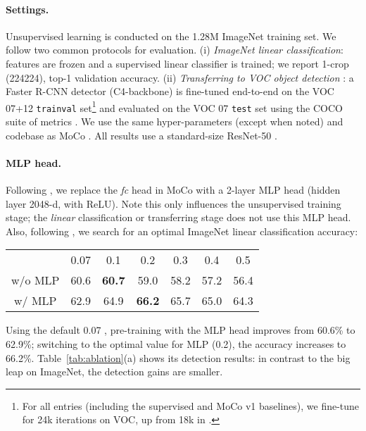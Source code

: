 \documentclass[10pt,twocolumn,letterpaper]{article}
\newcommand{\tablestyle}[2]{\setlength{\tabcolsep}{#1}\renewcommand{\arraystretch}{#2}\centering\footnotesize}
\begin{document}
\paragraph{Settings.}
Unsupervised learning is conducted on the 1.28M \mbox{ImageNet} \cite{Deng2009} training set.
We follow two common protocols for evaluation.
(i) \emph{ImageNet linear classification}: features are frozen and a supervised linear classifier is trained; we report 1-crop (224224), top-1 validation accuracy. (ii) \emph{Transferring to VOC object detection} \cite{Everingham2010}: a Faster R-CNN detector \cite{Ren2015} (C4-backbone) is fine-tuned end-to-end on the VOC 07+12 \texttt{trainval} set\footnote{For all entries (including the supervised and MoCo v1 baselines), we fine-tune for 24k iterations on VOC, up from 18k in \cite{He2019a}.} and evaluated on the VOC 07 \texttt{test} set using the COCO suite of metrics \cite{Lin2014}. We use the same hyper-parameters (except when noted) and codebase as MoCo \cite{He2019a}.
All results use a standard-size \mbox{ResNet-50} \cite{He2016}.

\paragraph{MLP head.} Following \cite{Chen2020}, we replace the \emph{fc} head in MoCo with a 2-layer MLP head (hidden layer 2048-d, with ReLU). Note this only influences the unsupervised training stage; the \emph{linear} classification or transferring stage does not use this MLP head.
Also, following \cite{Chen2020}, we search for an optimal  \wrt ImageNet linear classification accuracy:
\begin{center}
\vspace{-.3em}
\tablestyle{8pt}{1.0}	
\begin{tabular}{ccccccc}
 & 0.07 & 0.1 & 0.2 & 0.3 & 0.4 & 0.5 \\
\shline
w/o MLP & 60.6 & \textbf{60.7} & 59.0 & 58.2 & 57.2 & 56.4 \\
w/ MLP & 62.9 & 64.9 & \textbf{66.2} & 65.7 & 65.0 & 64.3 \\
\end{tabular}
\vspace{-.3em}
\end{center}
Using the default  0.07 \cite{Wu2018a,He2019a}, pre-training with the MLP head improves from 60.6\% to 62.9\%; switching to the optimal value for MLP (0.2), the accuracy increases to 66.2\%. Table~\ref{tab:ablation}(a) shows its detection results: in contrast to the big leap on ImageNet, the detection gains are smaller.
\end{document}
